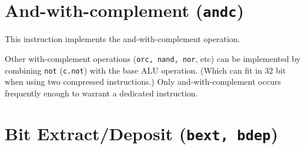 
\section{And-with-complement (\texttt{andc})}

This instruction implements the and-with-complement operation.



Other with-complement operations ({\tt orc, nand, nor}, etc) can be implemented
by combining {\tt not} ({\tt c.not}) with the base ALU operation. (Which can
fit in 32 bit when using two compressed instructions.) Only and-with-complement
occurs frequently enough to warrant a dedicated instruction.



%
%
%
%
%
%


\section{Bit Extract/Deposit (\texttt{bext,\ bdep})}

